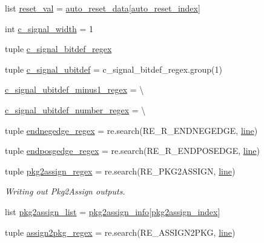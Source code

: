 \begin{DoxyCompactItemize}
list \hyperlink{namespaceveripy_a0b2d8a820c3d794138a0f30fe95f2617}{reset\-\_\-val} = \hyperlink{namespaceveripy_aed29c63170d881d76a0845d94c3d6bdd}{auto\-\_\-reset\-\_\-data}\mbox{[}\hyperlink{namespaceveripy_a796e24d0f42e97113536ef5675583aa3}{auto\-\_\-reset\-\_\-index}\mbox{]}
\item 
int \hyperlink{namespaceveripy_a6c7af7b6f61625967ad76e47ea97feb5}{c\-\_\-signal\-\_\-width} = 1
\item 
tuple \hyperlink{namespaceveripy_a236b47105aebf9535a23f5e3584fc8d5}{c\-\_\-signal\-\_\-bitdef\-\_\-regex}
\item 
tuple \hyperlink{namespaceveripy_aed3cb62c9f8ae9fa7f95a39dd184db5b}{c\-\_\-signal\-\_\-ubitdef} = c\-\_\-signal\-\_\-bitdef\-\_\-regex.\-group(1)
\item 
\hyperlink{namespaceveripy_a0eeaafa3dcfb8500938d8b7fc674b564}{c\-\_\-signal\-\_\-ubitdef\-\_\-minus1\-\_\-regex} = \textbackslash{}
\item 
\hyperlink{namespaceveripy_a941996ba01b912fdd56db5908c002a05}{c\-\_\-signal\-\_\-ubitdef\-\_\-number\-\_\-regex} = \textbackslash{}
\item 
tuple \hyperlink{namespaceveripy_a9985df4799df5dec0cca48bdf7e184ac}{endnegedge\-\_\-regex} = re.\-search(R\-E\-\_\-\-R\-\_\-\-E\-N\-D\-N\-E\-G\-E\-D\-G\-E, \hyperlink{namespaceveripy_a3cf9cf94513841f0d65d3081b08a55cc}{line})
\item 
tuple \hyperlink{namespaceveripy_afd21c96a818fcc01594b0a193e25f0f3}{endposgedge\-\_\-regex} = re.\-search(R\-E\-\_\-\-R\-\_\-\-E\-N\-D\-P\-O\-S\-E\-D\-G\-E, \hyperlink{namespaceveripy_a3cf9cf94513841f0d65d3081b08a55cc}{line})
\item 
tuple \hyperlink{namespaceveripy_a818213d44f5908b15037e7f70a2d5882}{pkg2assign\-\_\-regex} = re.\-search(R\-E\-\_\-\-P\-K\-G2\-A\-S\-S\-I\-G\-N, \hyperlink{namespaceveripy_a3cf9cf94513841f0d65d3081b08a55cc}{line})
\begin{DoxyCompactList}\small\item\em Writing out Pkg2\-Assign outputs. \end{DoxyCompactList}\item 
list \hyperlink{namespaceveripy_abab8384e1cd583db34af81db27a52544}{pkg2assign\-\_\-list} = \hyperlink{namespaceveripy_abb8af7474ba6f1fe4499f0baf5e6c9da}{pkg2assign\-\_\-info}\mbox{[}\hyperlink{namespaceveripy_ad519db7b0f685cc6c804c7ecc3bc02b5}{pkg2assign\-\_\-index}\mbox{]}
\item 
tuple \hyperlink{namespaceveripy_a7acecc4bebb723a0ef94b24f5130faac}{assign2pkg\-\_\-regex} = re.\-search(R\-E\-\_\-\-A\-S\-S\-I\-G\-N2\-P\-K\-G, \hyperlink{namespaceveripy_a3cf9cf94513841f0d65d3081b08a55cc}{line})

\end{DoxyCompactItemize}
